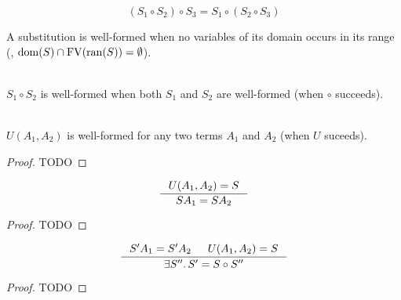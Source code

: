 \begin{theorem}
	\[(S_1\circ S_2) \circ S_3 = S_1 \circ (S_2 \circ S_3)\]
\end{theorem}


A substitution is well-formed when no variables of its domain
occurs in its range (\ie, $\mathop{\mathrm{dom}}(S)\cap\mathop{\mathrm{FV}}(\mathop{\mathrm{ran}}(S))=\emptyset$).

\begin{proposition}~\\
	\indent
$S_1\circ S_2$ is well-formed when both $S_1$ and $S_2$ are well-formed
(when $\circ$ succeeds).
\end{proposition}

\begin{proposition}
	~\\ \indent
	$U(A_1,A_2)$ is well-formed for any two terms $A_1$ and $A_2$
	(when $U$ suceeds).
\end{proposition}
\begin{proof}
	TODO
\end{proof}

\begin{theorem} \label{prop:uniU}
	\[ \inference{U(A_1,A_2)=S}{S A_1 = S A_2}\]
\end{theorem}
\begin{proof}
	TODO
\end{proof}

\begin{theorem} \label{prop:mguU}
\[ \inference{S' A_1 = S' A_2 & U(A_1,A_2)=S}{\exists S''.\, S' = S\circ S''} \]
\end{theorem}
\begin{proof}
	TODO
\end{proof}


